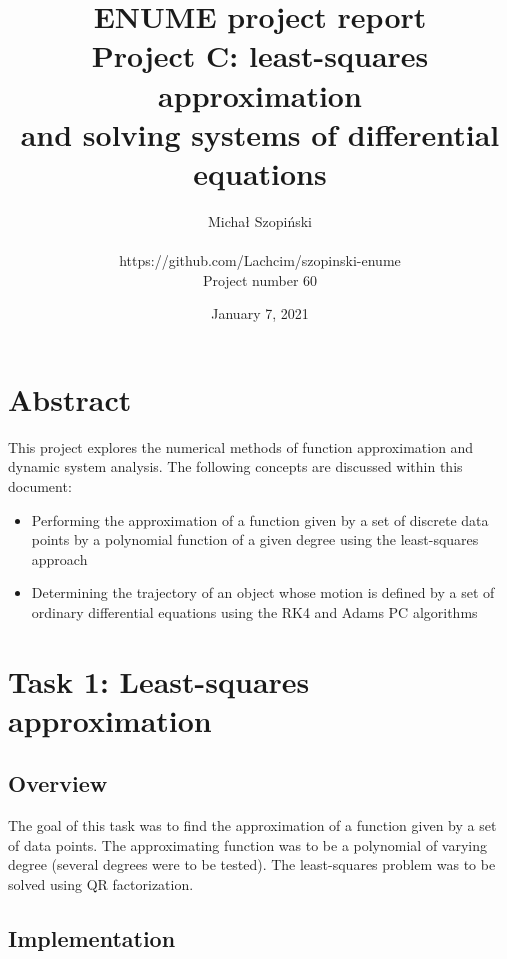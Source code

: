 \documentclass{article}
\begin{document}
	\title{ENUME project report\\Project C: least-squares approximation \\
	and solving systems of differential equations}
	\author{Michał Szopiński\\\\
	https://github.com/Lachcim/szopinski-enume\\
	Project number 60}
	\date{January 7, 2021}
	\maketitle
	
	
	\setcounter{section}{-1}
	\section{Abstract}
	
	This project explores the numerical methods of function approximation
	and dynamic system analysis. The following concepts are discussed within
	this document:
	
	\begin{itemize}
		\item Performing the approximation of a function given by a set of
		discrete data points by a polynomial function of a given degree
		using the least-squares approach
		\item Determining the trajectory of an object whose motion is
		defined by a set of ordinary differential equations using the RK4
		and Adams PC algorithms
	\end{itemize}
	
	\newpage
	
	\section{Task 1: Least-squares approximation}
	
	\subsection{Overview}
	
	The goal of this task was to find the approximation of a function given
	by a set of data points. The approximating function was to be a
	polynomial of varying degree (several degrees were to be tested). The
	least-squares problem was to be solved using QR factorization.
	
	\subsection{Implementation}
	
\end{document}
